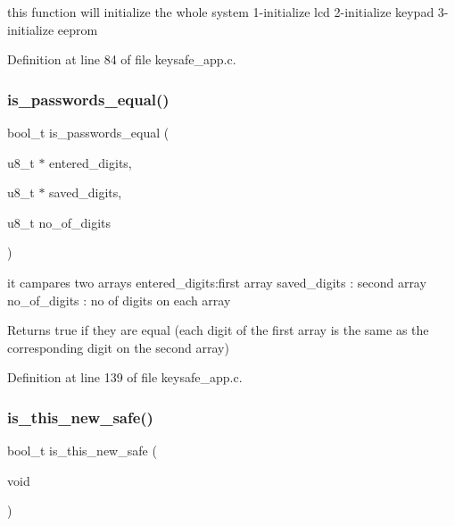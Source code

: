 this function will initialize the whole system 1-\/initialize lcd 2-\/initialize keypad 3-\/initialize eeprom 



Definition at line 84 of file keysafe\+\_\+app.\+c.

\mbox{\label{keysafe__app_8c_abd991a5536e811dcb1905f829ccd5b00}} 
\subsubsection{is\+\_\+passwords\+\_\+equal()}
{\footnotesize\ttfamily bool\+\_\+t is\+\_\+passwords\+\_\+equal (\begin{DoxyParamCaption}\item[{u8\+\_\+t $\ast$}]{entered\+\_\+digits,  }\item[{u8\+\_\+t $\ast$}]{saved\+\_\+digits,  }\item[{u8\+\_\+t}]{no\+\_\+of\+\_\+digits }\end{DoxyParamCaption})}



it campares two arrays  entered\+\_\+digits\+:first array  saved\+\_\+digits \+: second array  no\+\_\+of\+\_\+digits \+: no of digits on each array 

\begin{DoxyReturn}{Returns}
true if they are equal (each digit of the first array is the same as the corresponding digit on the second array) 
\end{DoxyReturn}


Definition at line 139 of file keysafe\+\_\+app.\+c.

\mbox{\label{keysafe__app_8c_abddbc83ddf10d7cc7afee52e98beec02}} 
\subsubsection{is\+\_\+this\+\_\+new\+\_\+safe()}
{\footnotesize\ttfamily bool\+\_\+t is\+\_\+this\+\_\+new\+\_\+safe (\begin{DoxyParamCaption}\item[{void}]{ }\end{DoxyParamCaption})}




